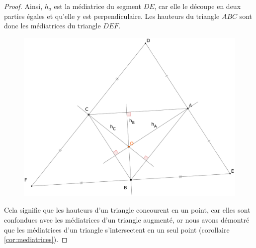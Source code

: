 \documentclass[a4paper,12pt]{article}
\begin{document}
\begin{proof}
Ainsi, $h_a$ est la médiatrice du segment $DE$, car elle le découpe en deux parties égales et qu'elle y est perpendiculaire. Les hauteurs du triangle $ABC$ sont donc les médiatrices du triangle $DEF$.

\begin{figure}[H]
        \centering
        \includegraphics[scale=0.15]{hauteur4.eps}
    \end{figure}

Cela signifie que les hauteurs d'un triangle concourent en un point, car elles sont confondues avec les médiatrices d'un triangle augmenté, or nous avons démontré que les médiatrices d'un triangle s'intersectent en un seul point (corollaire \ref{cor:mediatrices}).
\end{proof}
\end{document}

